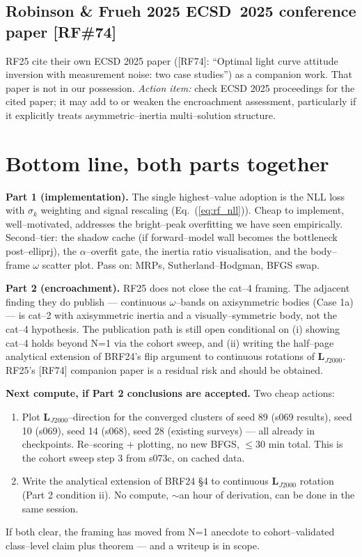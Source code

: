 \documentclass[11pt]{article}
\newcommand{\Lvec}{\mathbf{L}}
\newcommand{\LJ}{\Lvec_{J2000}}
\newcommand{\eq}[1]{Eq.~(\ref{#1})}
\begin{document}
\subsection{Robinson \& Frueh 2025 ECSD~2025 conference paper [RF\#74]}

\noindent
RF25 cite their own ECSD 2025 paper ([RF74]: ``Optimal light curve attitude
inversion with measurement noise: two case studies'') as a companion work.
That paper is not in our possession. \emph{Action item:} check ECSD 2025
proceedings for the cited paper; it may add to or weaken the encroachment
assessment, particularly if it explicitly treats asymmetric--inertia
multi--solution structure.

\section*{Bottom line, both parts together}

\noindent
\textbf{Part 1 (implementation).} The single highest--value adoption is the
NLL loss with $\sigma_k$ weighting and signal rescaling (\eq{eq:rf_nll}). Cheap
to implement, well--motivated, addresses the bright--peak overfitting we have
seen empirically. Second--tier: the shadow cache (if forward--model wall
becomes the bottleneck post--elliprj), the $\alpha$--overfit gate, the inertia
ratio visualisation, and the body--frame $\omega$ scatter plot. Pass on:
MRPs, Sutherland--Hodgman, BFGS swap.

\textbf{Part 2 (encroachment).} RF25 does not close the cat--4 framing. The
adjacent finding they do publish --- continuous $\omega$--bands on
axisymmetric bodies (Case 1a) --- is cat--2 with axisymmetric inertia and a
visually--symmetric body, not the cat--4 hypothesis. The publication path is
still open conditional on (i) showing cat--4 holds beyond N=1 via the
cohort sweep, and (ii) writing the half--page analytical extension of BRF24's
flip argument to continuous rotations of $\LJ$. RF25's [RF74] companion
paper is a residual risk and should be obtained.

\textbf{Next compute, if Part 2 conclusions are accepted.} Two cheap
actions:
\begin{enumerate}
\item Plot $\LJ$--direction for the converged clusters of seed 89 (s069
results), seed 10 (s069), seed 14 (s068), seed 28 (existing surveys) ---
all already in checkpoints. Re--scoring + plotting, no new BFGS, $\leq$30 min
total. This is the cohort sweep step 3 from s073c, on cached data.
\item Write the analytical extension of BRF24 \S4 to continuous $\LJ$
rotation (Part 2 condition ii). No compute, $\sim$an hour of
derivation, can be done in the same session.
\end{enumerate}

\noindent
If both clear, the framing has moved from N=1 anecdote to cohort--validated
class--level claim plus theorem --- and a writeup is in scope.
\end{document}
